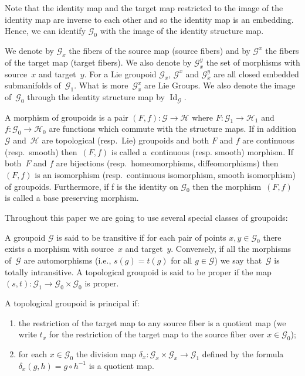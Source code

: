 \documentclass[pdftex]{sigma}
\begin{document}
\begin{rem} Note that the identity map and the target map restricted to the image of the identity map are inverse to each other and so the identity map is an embedding. Hence, we can identify $\mathcal{G}_0$ with the image of the identity structure map.
\end{rem}
We denote by $\mathcal{G}_x$ the fibers of the source map (source fibers) and by $\mathcal{G}^x$ the fibers of the target map (target fibers). We also denote by $\mathcal{G}^y_x$ the set of morphisms with source~$x$ and target~$y$. For a Lie groupoid $\mathcal{G}_x$, $\mathcal{G}^x$ and $\mathcal{G}^y_x$ are all closed embedded submanifolds of~$\mathcal{G}_1$. What is more~$\mathcal{G}^x_x$ are Lie Groups. We also denote the image of~$\mathcal{G}_0$ through the identity structure map by $\operatorname{Id}_{\mathcal{G}}$.
\begin{defi} A morphism of groupoids is a pair $(F,f)\colon \mathcal{G}\rightarrow\mathcal{H}$ where $F\colon \mathcal{G}_1\rightarrow\mathcal{H}_1$ and $f\colon \mathcal{G}_0\rightarrow\mathcal{H}_0$ are functions which commute with the structure maps. If in addition~$\mathcal{G}$ and~$\mathcal{H}$ are topological (resp.\ Lie) groupoids and both $F$ and $f$ are continuous (resp.\ smooth) then~$(F,f)$ is called a~continuous (resp. smooth) morphism. If both~$F$ and $f$ are bijections (resp.\ homeo\-morphisms, diffeomorphisms) then $(F,f)$ is an isomorphism (resp.\ continuous isomorphism, smooth isomorphism) of groupoids. Furthermore, if f is the identity on $\mathcal{G}_0$ then the morphism~$(F,f)$ is called a base preserving morphism.
\end{defi}
Throughout this paper we are going to use several special classes of groupoids:
\begin{defi} A groupoid $\mathcal{G}$ is said to be transitive if for each pair of points $x,y\in\mathcal{G}_0$ there exists a morphism with source~$x$ and target~$y$. Conversely, if all the morphisms of~$\mathcal{G}$ are automorphisms (i.e., $s(g) = t(g)$ for all $g\in \mathcal{G}$) we say that~$\mathcal{G}$ is totally intransitive. A topological groupoid is said to be proper if the map $(s,t)\colon \mathcal{G}_1\rightarrow\mathcal{G}_0\times\mathcal{G}_0$ is proper.
\end{defi}
\begin{defi} A topological groupoid is principal if:
\begin{enumerate}\itemsep=0pt
\item[1)] the restriction of the target map to any source fiber is a quotient map (we write $t_x$ for the restriction of the target map to the source fiber over $x\in\mathcal{G}_0$);
\item[2)] for each $x\in\mathcal{G}_0$ the division map $\delta_x\colon \mathcal{G}_x\times\mathcal{G}_x\rightarrow\mathcal{G}_1$ defined by the formula $\delta_x(g,h)=g\circ h^{-1}$ is a quotient map.
\end{enumerate}
\end{defi}
\end{document}
